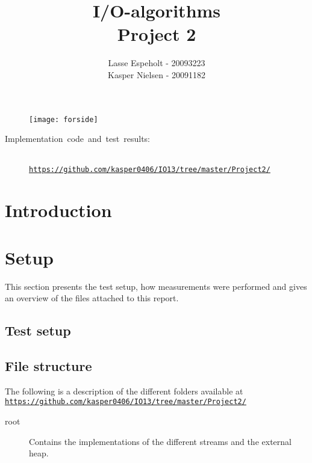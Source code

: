 \documentclass[a4paper,12pt]{article}
\begin{document}
\title{I/O-algorithms\\Project 2}

\author{Lasse Espeholt - 20093223\\
Kasper Nielsen - 20091182\\}

\maketitle
\begin{figure}[h!]
\texttt{[image: forside]}
\end{figure}

\vfill{}
\begin{description}
\item [{Implementation~code~and~test~results:}]~
\\
\texttt{\url{https://github.com/kasper0406/IO13/tree/master/Project2/}}
\end{description}
\pagebreak{}\tableofcontents{}\pagebreak{}

\section{Introduction}


\section{Setup}
This section presents the test setup, how measurements were performed
and gives an overview of the files attached to this report.

\subsection{Test setup}


\subsection{File structure}
The following is a description of the different folders available at
\\
\texttt{\url{https://github.com/kasper0406/IO13/tree/master/Project2/}}
\begin{description}
\item[root] Contains the implementations of the different streams and
  the external heap.


\end{description}
\end{document}
